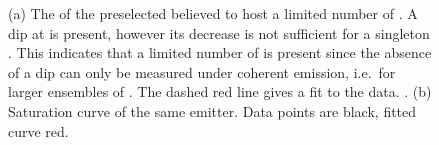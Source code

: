 				\begin{figure}[htp]
					\begin{subfigure}[t]{ 0.49\linewidth}
						\centering
						\caption{}
						\label{subfig::single_siv_g2_before_transfer_antenna}
					\end{subfigure}
					\hfill
					\begin{subfigure}[t]{ 0.49\linewidth}
						\centering
						\caption{}
						\label{subfig::single_siv_sat_before_transfer_antenna}
					\end{subfigure}
					\caption[Properties of a \nd containing a few \sivs]{(a) The \gtf of the preselected \nd believed to host a limited number of \sivs. A dip at \gtz is present, however its decrease is not sufficient for a singleton \siv. This indicates that a limited number of \sivs is present since the absence of a dip can only be measured under coherent emission, i.e.\ for larger ensembles of \sivs. The dashed red line gives a fit to the data. . (b) Saturation curve of the same emitter. Data points are black, fitted curve red.}
				\end{figure}

